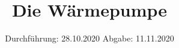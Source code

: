 

\subject{D206}
\title{Die Wärmepumpe}
\date{
    Durchführung: 28.10.2020
    \hspace{3em}
    Abgabe: 11.11.2020
}



\maketitle
\thispagestyle{empty}
\tableofcontents
\newpage


\newpage


\newpage


\newpage


\newpage

\printbibliography


